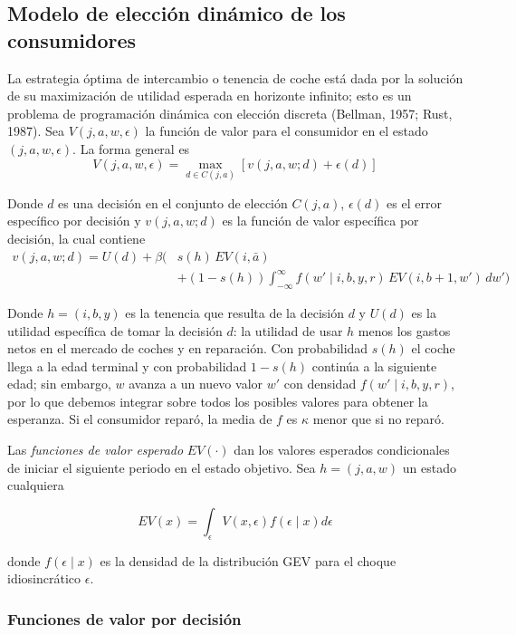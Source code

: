 \documentclass{article}
\begin{document}
\subsection{Modelo de elección dinámico de los consumidores}

La estrategia óptima de intercambio o tenencia de coche está dada por la solución de su maximización de utilidad esperada en horizonte infinito; esto es un problema de programación dinámica con elección discreta (Bellman, 1957; Rust, 1987). Sea $V(j,a,w,\epsilon)$ la función de valor para el consumidor en el estado $(j,a,w,\epsilon)$. La forma general es
$$V(j,a,w,\epsilon)=\max_{d\in C(j,a)}\left[ v(j,a,w;d)+\epsilon(d) \right]$$

Donde $d$ es una decisión en el conjunto de elección $C(j,a)$, $\epsilon(d)$ es el error específico por decisión y $v(j,a,w;d)$ es la función de valor específica por decisión, la cual contiene
$$\begin{aligned}v(j,a,w;d)=U(d)+\beta\Big( &s(h)\, EV(i,\bar{a})\\ &+ (1-s(h)) \textstyle\int_{-\infty}^{\infty}f(w'\mid i,b,y,r)\,EV(i,b+1,w')\,dw'\Big)\end{aligned}$$

Donde $h=(i,b,y)$ es la tenencia que resulta de la decisión $d$ y $U(d)$ es la utilidad específica de tomar la decisión $d$: la utilidad de usar $h$ menos los gastos netos en el mercado de coches y en reparación. Con probabilidad $s(h)$ el coche llega a la edad terminal y con probabilidad $1-s(h)$ continúa a la siguiente edad; sin embargo, $w$ avanza a un nuevo valor $w'$ con densidad $f(w'\mid i,b,y,r)$, por lo que debemos integrar sobre todos los posibles valores para obtener la esperanza. Si el consumidor reparó, la media de $f$ es $\kappa$ menor que si no reparó.

Las \textit{funciones de valor esperado} $EV(\cdot)$ dan los valores esperados condicionales de iniciar el siguiente periodo en el estado objetivo. Sea $h=(j,a,w)$ un estado cualquiera

$$EV(x)=\int_{\epsilon}V(x,\epsilon)f(\epsilon\mid x)d\epsilon$$

donde $f(\epsilon\mid x)$ es la densidad de la distribución GEV para el choque idiosincrático $\epsilon$.

\subsubsection{Funciones de valor por decisión}
\end{document}
